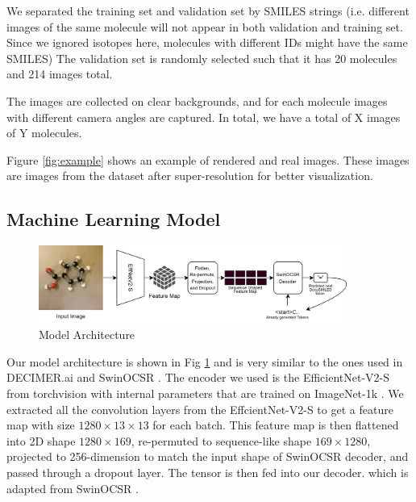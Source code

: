 \documentclass{article}
\begin{document}
We separated the training set and validation set by SMILES strings (i.e. different images of the same molecule will not appear in both validation and training set. Since we ignored isotopes here, molecules with different IDs might have the same SMILES) The validation set is randomly selected such that it has 20 molecules and 214 images total. 

The images are collected on clear backgrounds, and for each molecule images with different camera angles are captured. In total, we have a total of X images of Y molecules. 

Figure \ref{fig:example} shows an example of rendered and real images. These images are images from the dataset after super-resolution for better visualization. 
\subsection{Machine Learning Model} 
\begin{figure}
    \centering
    \includegraphics[width=0.9\textwidth]{arch}
    \caption{Model Architecture}
    \label{fig:arch}
\end{figure}
Our model architecture is shown in Fig \ref{fig:arch} and is very similar to the ones used in DECIMER.ai \autocite{decimer} and SwinOCSR \autocite{swinocsr}. The encoder we used is the EfficientNet-V2-S \autocite{effv2} from torchvision \autocite{torchvision2016} with internal parameters that are trained on ImageNet-1k \autocite{imagenet}. We extracted all the convolution layers from the EffcientNet-V2-S to get a feature map with size $1280\times13\times13$  for each batch. This feature map is then flattened into 2D shape $1280\times169$, re-permuted to sequence-like shape $169\times1280$, projected to 256-dimension to match the input shape of SwinOCSR decoder, and passed through a dropout layer. The tensor is then fed into our decoder. which is adapted from SwinOCSR \autocite{swinocsr}. 

\end{document}
